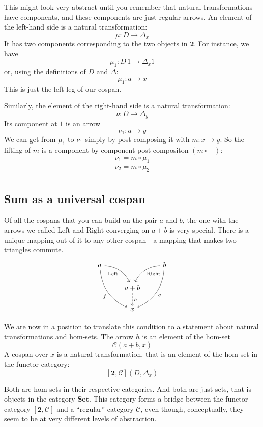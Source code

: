 \documentclass[DaoFP]{subfiles}
\begin{document}
This might look very abstract until you remember that natural transformations have components, and these components are just regular arrows. An element of the left-hand side is a natural transformation:
\[ \mu \colon D \to \Delta_x \]
It has two components corresponding to the two objects in $\mathbf{2}$. For instance, we have
\[ \mu_1 \colon D \, 1 \to \Delta_x 1 \]
or, using the definitions of $D$ and $\Delta$:
\[ \mu_1 \colon a \to x \]
This is just the left leg of our cospan. 

Similarly, the element of the right-hand side is a natural transformation:
\[ \nu \colon D \to \Delta_{y} \]
Its component at $1$ is an arrow
\[ \nu_1 \colon a \to y \]
We can get from $\mu_1$ to $\nu_1$ simply by post-composing it with $m \colon x \to y$. So the lifting of $m$ is a component-by-component post-compositon $(m \circ -)$:
\begin{align*}
\nu_1 = m \circ \mu_1 \\
\nu_2 = m \circ \mu_2 \\
\end{align*}

\subsection{Sum as a universal cospan}

Of all the cospans that you can build on the pair $a$ and $b$, the one with the arrows we called $\text{Left}$ and $\text{Right}$ converging on $a + b$  is very special. There is a unique mapping out of it to any other cospan---a mapping that makes two triangles commute.  
\[
 \begin{tikzcd}
 a
 \arrow[dr,  bend left, "\text{Left}"']
 \arrow[ddr, bend right, "f"']
 && b
 \arrow[dl, bend right, "\text{Right}"]
 \arrow[ddl, bend left, "g"]
 \\
&a + b
\arrow[d, dashed, "h"]
\\
& x
 \end{tikzcd}
\]

We are now in a position to translate this condition to a statement about natural transformations and hom-sets. The arrow $h$ is an element of the hom-set 
\[ \mathcal{C}(a + b, x)\]
A cospan over $x$ is a natural transformation, that is an element of the hom-set in the functor category:
\[ [\mathbf{2}, \mathcal{C}](D, \Delta_x) \]

Both are hom-sets in their respective categories. And both are just sets, that is objects in the category $\mathbf{Set}$. This category forms a bridge between the functor category $[\mathbf{2}, \mathcal{C}]$ and a ``regular'' category $\mathcal{C}$, even though, conceptually, they seem to be at very different levels of abstraction. 
\end{document}
